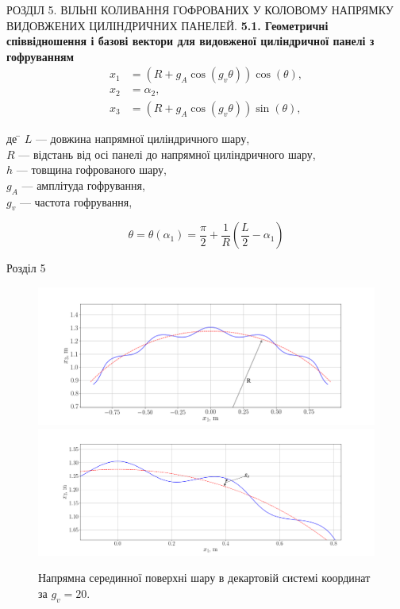 \documentclass[8pt]{beamer}
\numberwithin{figure}{section}
\numberwithin{equation}{section}
\numberwithin{table}{section}
\begin{document}
\begin{frame}{РОЗДІЛ 5. ВІЛЬНІ КОЛИВАННЯ ГОФРОВАНИХ У КОЛОВОМУ НАПРЯМКУ ВИДОВЖЕНИХ ЦИЛІНДРИЧНИХ ПАНЕЛЕЙ.}
\textbf{5.1. Геометричні співвідношення і базові вектори для видовженої циліндричної панелі з гофруванням}
\\
\vspace{1em}
\begin{equation}
\begin{aligned}
x_1&=\left(R + g_{A}\cos\left(g_v\theta\right) \right)\cos\left(\theta\right), \\
x_2&=\alpha_2,\\
x_3&=\left(R + g_{A}\cos\left(g_v\theta\right) \right)\sin\left(\theta\right), 
\end{aligned}
\end{equation}

\begin{tabbing}
де \= $L$ --- довжина напрямної циліндричного шару,\\
\> $R$ --- відстань від осі панелі до напрямної циліндричного шару,\\
\> $h$ --- товщина гофрованого шару,\\
\> $g_A$ --- амплітуда гофрування,\\
\> $g_v$ --- частота гофрування,\\
\end{tabbing}
\[
\theta=\theta\left(\alpha_1\right)=\frac{\pi}{2}+\frac{1}{R}\left(\frac{L}{2}-\alpha_1\right)\]


\end{frame}

\begin{frame}{Розділ 5}

\begin{figure}
	\includegraphics[width=0.8\linewidth]{pic/cor_geomR.png}\\
	\includegraphics[width=0.8\linewidth]{pic/cor_geom_zoomedR.png}
		\caption{Напрямна серединної поверхні шару в декартовій системі координат за $g_v=20$.}
		\label{fig:omage_K_h}
\end{figure}



\end{frame}
\end{document}

